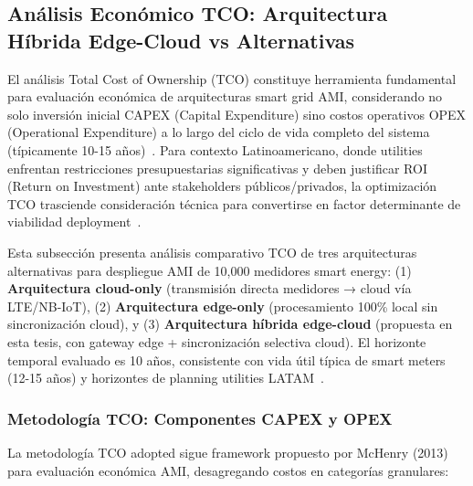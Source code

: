 
\subsection{Análisis Económico TCO: Arquitectura Híbrida Edge-Cloud vs Alternativas}
\label{sec:tco-analysis}

El análisis Total Cost of Ownership (TCO) constituye herramienta fundamental para evaluación económica de arquitecturas smart grid AMI, considerando no solo inversión inicial CAPEX (Capital Expenditure) sino costos operativos OPEX (Operational Expenditure) a lo largo del ciclo de vida completo del sistema (típicamente 10-15 años)~\cite{mchenryTechnicalGovernanceConsiderations2013,denigrisSmartGridsLatin2016}. Para contexto Latinoamericano, donde utilities enfrentan restricciones presupuestarias significativas y deben justificar ROI (Return on Investment) ante stakeholders públicos/privados, la optimización TCO trasciende consideración técnica para convertirse en factor determinante de viabilidad deployment~\cite{brichettiInfrastructureGapLatin2021}.

Esta subsección presenta análisis comparativo TCO de tres arquitecturas alternativas para despliegue AMI de 10,000 medidores smart energy: (1) \textbf{Arquitectura cloud-only} (transmisión directa medidores → cloud vía LTE/NB-IoT), (2) \textbf{Arquitectura edge-only} (procesamiento 100\% local sin sincronización cloud), y (3) \textbf{Arquitectura híbrida edge-cloud} (propuesta en esta tesis, con gateway edge + sincronización selectiva cloud). El horizonte temporal evaluado es 10 años, consistente con vida útil típica de smart meters (12-15 años) y horizontes de planning utilities LATAM~\cite{denigrisSmartGridsLatin2016}.

\subsubsection{Metodología TCO: Componentes CAPEX y OPEX}

La metodología TCO adopted sigue framework propuesto por McHenry (2013)~\cite{mchenryTechnicalGovernanceConsiderations2013} para evaluación económica AMI, desagregando costos en categorías granulares:

